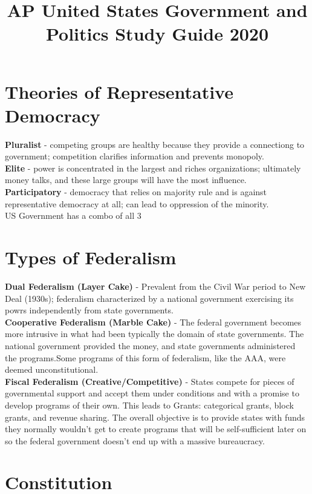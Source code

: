 \documentclass[12pt]{article}
\title{AP United States Government and Politics Study Guide 2020}
\date{ }
\begin{document}
\maketitle

\section*{Theories of Representative Democracy}
	\textbf{Pluralist} - competing groups are healthy because they provide a connectiong to government; competition clarifies information and prevents monopoly.\\
	\textbf{Elite} - power is concentrated in the largest and riches organizations; ultimately money talks, and these large groups will have the most influence.\\
	\textbf{Participatory} - democracy that relies on majority rule and is against representative democracy at all; can lead to oppression of the minority.\\
	US Government has a combo of all 3\\

\section*{Types of Federalism}
\textbf{Dual Federalism (Layer Cake)} - Prevalent from the Civil War period to New Deal (1930s); federalism characterized by a national government exercising its powrs independently from state governments. \\
\textbf{Cooperative Federalism (Marble Cake)} - The federal government becomes more intrusive in what had been typically the domain of state governments. The national government provided the money, and state governments administered the programs.Some programs of this form of federalism, like the AAA, were deemed unconstitutional.\\
\textbf{Fiscal Federalism (Creative/Competitive)} - States compete for pieces of governmental support and accept them under conditions and with a promise to develop programs of their own. This leads to Grants: categorical grants, block grants, and revenue sharing. The overall objective is to provide states with funds they normally wouldn't get to create programs that will be self-sufficient later on so the federal government doesn't end up with a massive bureaucracy.\\

\section*{Constitution}
\end{document}
